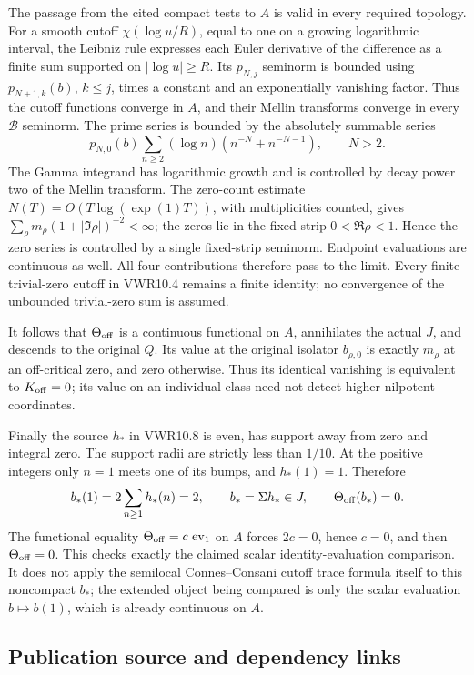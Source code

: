The passage from the cited compact tests to \(A\) is valid in every
required topology. For a smooth cutoff \(\chi(\log u/R)\), equal to one
on a growing logarithmic interval, the Leibniz rule expresses each Euler
derivative of the difference as a finite sum supported on
\(|\log u|\geq R\). Its \(p_{N,j}\) seminorm is bounded using
\(p_{N+1,k}(b)\), \(k\leq j\), times a constant and an exponentially
vanishing factor. Thus the cutoff functions converge in \(A\), and their
Mellin transforms converge in every \(\mathcal B\) seminorm. The prime
series is bounded by the absolutely summable series \[
p_{N,0}(b)\sum_{n\geq2}(\log n)(n^{-N}+n^{-N-1}),\qquad N>2.
\] The Gamma integrand has logarithmic growth and is controlled by decay
power two of the Mellin transform. The zero-count estimate
\(N(T)=O(T\log(\exp(1)T))\), with multiplicities counted, gives
\(\sum_\rho m_\rho(1+|\Im\rho|)^{-2}<\infty\); the zeros lie in the
fixed strip \(0<\Re\rho<1\). Hence the zero series is controlled by a
single fixed-strip seminorm. Endpoint evaluations are continuous as
well. All four contributions therefore pass to the limit. Every finite
trivial-zero cutoff in VWR10.4 remains a finite identity; no convergence
of the unbounded trivial-zero sum is assumed.

It follows that \(\Theta_{\rm off}\) is a continuous functional on
\(A\), annihilates the actual \(J\), and descends to the original \(Q\).
Its value at the original isolator \(b_{\rho,0}\) is exactly \(m_\rho\)
at an off-critical zero, and zero otherwise. Thus its identical
vanishing is equivalent to \(K_{\rm off}=0\); its value on an individual
class need not detect higher nilpotent coordinates.

Finally the source \(h_*\) in VWR10.8 is even, has support away from
zero and integral zero. The support radii are strictly less than
\(1/10\). At the positive integers only \(n=1\) meets one of its bumps,
and \(h_*(1)=1\). Therefore \[
b_*(1)=2\sum_{n\geq1}h_*(n)=2,\qquad
b_*=\Sigma h_*\in J,\qquad \Theta_{\rm off}(b_*)=0.
\] The functional equality \(\Theta_{\rm off}=c\,\operatorname{ev}_1\)
on \(A\) forces \(2c=0\), hence \(c=0\), and then
\(\Theta_{\rm off}=0\). This checks exactly the claimed scalar
identity-evaluation comparison. It does not apply the semilocal
Connes--Consani cutoff trace formula itself to this noncompact \(b_*\);
the extended object being compared is only the scalar evaluation
\(b\mapsto b(1)\), which is already continuous on \(A\).

\subsection{Publication source and dependency
links}\label{publication-source-and-dependency-links}

